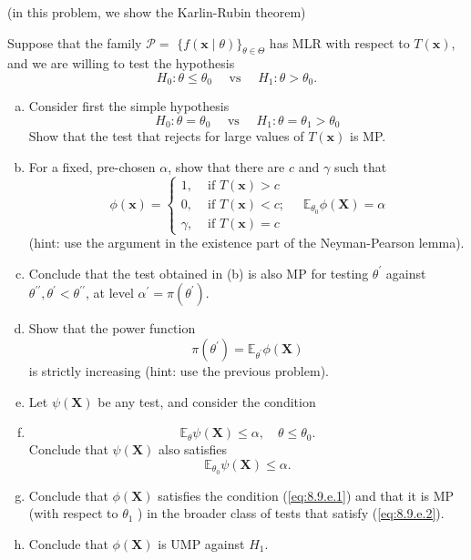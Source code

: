 \begin{ex}
    (in this problem, we show the Karlin-Rubin theorem)

    Suppose that the family \(\mathcal{P}=\) \(\{f(\mathbf{x} \mid \theta)\}_{\theta \in \Theta}\) has MLR with respect to \(T(\mathbf{x})\), and we are willing to test the hypothesis
    \[
        H_{0}: \theta \leq \theta_{0} \quad \text { vs } \quad H_{1}: \theta>\theta_{0}. 
    \]
    \begin{enumerate}[(a)]
        \item Consider first the simple hypothesis
        \[
        H_{0}: \theta=\theta_{0} \quad \text { vs } \quad H_{1}: \theta=\theta_{1}>\theta_{0}
        \]
        Show that the test that rejects for large values of \(T(\mathbf{x})\) is MP. 
        \item For a fixed, pre-chosen \(\alpha\), show that there are \(c\) and \(\gamma\) such that
        \[
        \phi(\mathbf{x})=\left\{\begin{array}{ll}
        1, & \text { if } T(\mathbf{x})>c \\
        0, & \text { if } T(\mathbf{x})<c ; \\
        \gamma, & \text { if } T(\mathbf{x})=c
        \end{array} \quad \mathbb{E}_{\theta_{0}} \phi(\mathbf{X})=\alpha\right.
        \]
        (hint: use the argument in the existence part of the Neyman-Pearson lemma).
        \item Conclude that the test obtained in (b) is also MP for testing \(\theta^{\prime}\) against \(\theta^{\prime \prime}, \theta^{\prime}<\theta^{\prime \prime}\), at level \(\alpha^{\prime}=\pi\left(\theta^{\prime}\right)\). 
        \item Show that the power function
        \[
            \pi\left(\theta^{\prime}\right)=\mathbb{E}_{\theta^{\prime}} \phi(\mathbf{X})
        \]
        is strictly increasing (hint: use the previous problem). 
        \item Let \(\psi(\mathbf{X})\) be any test, and consider the condition
        \item 
        \begin{equation}
            \label{eq:8.9.e.1}
            \mathbb{E}_{\theta} \psi(\mathbf{X}) \leq \alpha, \quad \theta \leq \theta_{0}. 
        \end{equation}
        Conclude that \(\psi(\mathbf{X})\) also satisfies
        \begin{equation}
            \label{eq:8.9.e.2}
            \mathbb{E}_{\theta_{0}} \psi(\mathbf{X}) \leq \alpha. 
        \end{equation}
        \item Conclude that \(\phi(\mathbf{X})\) satisfies the condition (\ref{eq:8.9.e.1}) and that it is MP (with respect to \(\theta_{1}\) ) in the broader class of tests that satisfy (\ref{eq:8.9.e.2}). 
        \item Conclude that \(\phi(\mathbf{X})\) is UMP against \(H_{1}\). 
        

\end{enumerate}
\end{ex}
